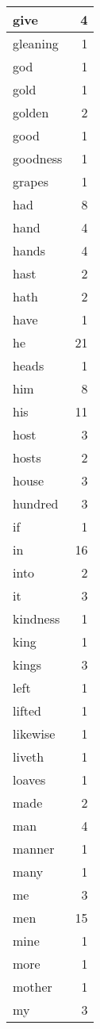 \begin{center}
\begin{longtable}{l|r}
give & 4\\ \hline 
gleaning & 1\\ \hline 
god & 1\\ \hline 
gold & 1\\ \hline 
golden & 2\\ \hline 
good & 1\\ \hline 
goodness & 1\\ \hline 
grapes & 1\\ \hline 
had & 8\\ \hline 
hand & 4\\ \hline 
hands & 4\\ \hline 
hast & 2\\ \hline 
hath & 2\\ \hline 
have & 1\\ \hline 
he & 21\\ \hline 
heads & 1\\ \hline 
him & 8\\ \hline 
his & 11\\ \hline 
host & 3\\ \hline 
hosts & 2\\ \hline 
house & 3\\ \hline 
hundred & 3\\ \hline 
if & 1\\ \hline 
in & 16\\ \hline 
into & 2\\ \hline 
it & 3\\ \hline 
kindness & 1\\ \hline 
king & 1\\ \hline 
kings & 3\\ \hline 
left & 1\\ \hline 
lifted & 1\\ \hline 
likewise & 1\\ \hline 
liveth & 1\\ \hline 
loaves & 1\\ \hline 
made & 2\\ \hline 
man & 4\\ \hline 
manner & 1\\ \hline 
many & 1\\ \hline 
me & 3\\ \hline 
men & 15\\ \hline 
mine & 1\\ \hline 
more & 1\\ \hline 
mother & 1\\ \hline 
my & 3\\ \hline 

\end{longtable}
\end{center}
